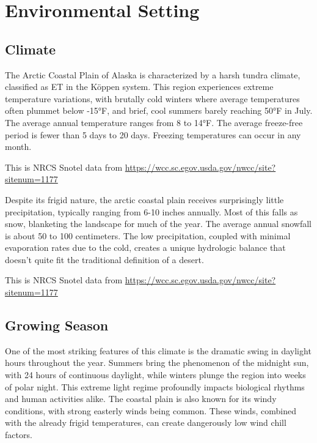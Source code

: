 \documentclass[
]{book}
\theoremstyle{definition}
\theoremstyle{definition}
\theoremstyle{definition}
\theoremstyle{definition}
\theoremstyle{remark}
\begin{document}
\hypertarget{environmental-setting}{%
\chapter{Environmental Setting}\label{environmental-setting}}

\hypertarget{climate}{%
\section{Climate}\label{climate}}

The Arctic Coastal Plain of Alaska is characterized by a harsh tundra climate, classified as ET in the Köppen system. This region experiences extreme temperature variations, with brutally cold winters where average temperatures often plummet below -15°F, and brief, cool summers barely reaching 50°F in July. The average annual temperature ranges from 8 to 14°F. The average freeze-free period is fewer than 5 days to 20 days. Freezing temperatures can occur in any month.

\label{fig:unnamed-chunk-3}This is NRCS Snotel data from \url{https://wcc.sc.egov.usda.gov/nwcc/site?sitenum=1177}

Despite its frigid nature, the arctic coastal plain receives surprisingly little precipitation, typically ranging from 6-10 inches annually. Most of this falls as snow, blanketing the landscape for much of the year. The average annual snowfall is about 50 to 100 centimeters. The low precipitation, coupled with minimal evaporation rates due to the cold, creates a unique hydrologic balance that doesn't quite fit the traditional definition of a desert.

\label{fig:unnamed-chunk-4}This is NRCS Snotel data from \url{https://wcc.sc.egov.usda.gov/nwcc/site?sitenum=1177}

\hypertarget{growing-season}{%
\section{Growing Season}\label{growing-season}}

One of the most striking features of this climate is the dramatic swing in daylight hours throughout the year. Summers bring the phenomenon of the midnight sun, with 24 hours of continuous daylight, while winters plunge the region into weeks of polar night. This extreme light regime profoundly impacts biological rhythms and human activities alike. The coastal plain is also known for its windy conditions, with strong easterly winds being common. These winds, combined with the already frigid temperatures, can create dangerously low wind chill factors.
\end{document}
